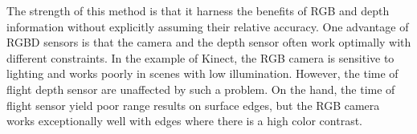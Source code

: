 The strength of this method is that it harness the benefits of RGB and depth information without explicitly assuming their relative accuracy. One advantage of RGBD sensors is that the camera and the depth sensor often work optimally with different constraints. In the example of Kinect, the RGB camera is sensitive to lighting and works poorly in scenes with low illumination. However, the time of flight depth sensor are unaffected by such a problem. On the hand, the time of flight sensor yield poor range results on surface edges, but the RGB camera works exceptionally well with edges where there is a high color contrast. 